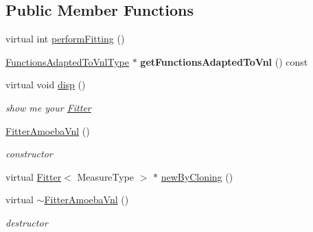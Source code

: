 \subsection*{Public Member Functions}
\begin{DoxyCompactItemize}
\item 
virtual int \hyperlink{class_ox_1_1_fitter_amoeba_vnl_a0c198974c2a95d0eb35cfe4c838e516c}{perform\-Fitting} ()
\item 
\hypertarget{class_ox_1_1_fitter_amoeba_vnl_a535465acadc24ac91302707f0ca60af2}{\hyperlink{class_ox_1_1_functions_t1_adapter_vnl_cost}{Functions\-Adapted\-To\-Vnl\-Type} $\ast$ {\bfseries get\-Functions\-Adapted\-To\-Vnl} () const }\label{class_ox_1_1_fitter_amoeba_vnl_a535465acadc24ac91302707f0ca60af2}

\item 
\hypertarget{class_ox_1_1_fitter_amoeba_vnl_ad779b5917e426add15c5a46e4dc6bfa8}{virtual void \hyperlink{class_ox_1_1_fitter_amoeba_vnl_ad779b5917e426add15c5a46e4dc6bfa8}{disp} ()}\label{class_ox_1_1_fitter_amoeba_vnl_ad779b5917e426add15c5a46e4dc6bfa8}

\begin{DoxyCompactList}\small\item\em show me your \hyperlink{class_ox_1_1_fitter}{Fitter} \end{DoxyCompactList}\item 
\hypertarget{class_ox_1_1_fitter_amoeba_vnl_af88c09a381c612c9027df9ce6b482ce2}{\hyperlink{class_ox_1_1_fitter_amoeba_vnl_af88c09a381c612c9027df9ce6b482ce2}{Fitter\-Amoeba\-Vnl} ()}\label{class_ox_1_1_fitter_amoeba_vnl_af88c09a381c612c9027df9ce6b482ce2}

\begin{DoxyCompactList}\small\item\em constructor \end{DoxyCompactList}\item 
virtual \hyperlink{class_ox_1_1_fitter}{Fitter}$<$ Measure\-Type $>$ $\ast$ \hyperlink{class_ox_1_1_fitter_amoeba_vnl_a4c0c209a5006908c027c5a859b63b385}{new\-By\-Cloning} ()
\item 
\hypertarget{class_ox_1_1_fitter_amoeba_vnl_a80f876905cc4f5019dbbcfdbec257f79}{virtual \hyperlink{class_ox_1_1_fitter_amoeba_vnl_a80f876905cc4f5019dbbcfdbec257f79}{$\sim$\-Fitter\-Amoeba\-Vnl} ()}\label{class_ox_1_1_fitter_amoeba_vnl_a80f876905cc4f5019dbbcfdbec257f79}

\begin{DoxyCompactList}\small\item\em destructor \end{DoxyCompactList}\end{DoxyCompactItemize}
